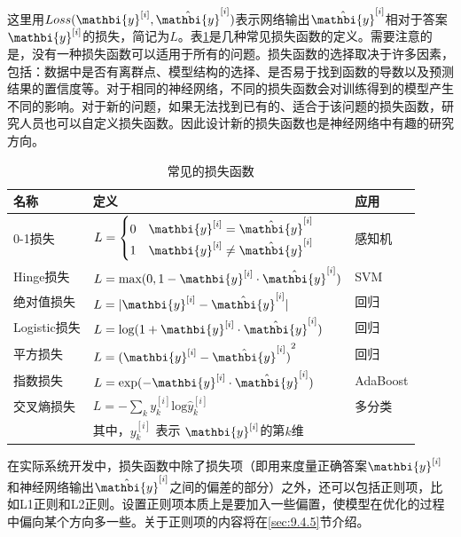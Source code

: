 \parinterval 这里用$ Loss({\mathbi{y}}^{[i]},{\hat{\mathbi{y}}}^{[i]}) $表示网络输出$ {\hat{\mathbi{y}}}^{[i]} $相对于答案$ {\mathbi{y}}^{[i]} $的损失，简记为$ L $。表\ref{tab:9-3}是几种常见损失函数的定义。需要注意的是，没有一种损失函数可以适用于所有的问题。损失函数的选择取决于许多因素，包括：数据中是否有离群点、模型结构的选择、是否易于找到函数的导数以及预测结果的置信度等。对于相同的神经网络，不同的损失函数会对训练得到的模型产生不同的影响。对于新的问题，如果无法找到已有的、适合于该问题的损失函数，研究人员也可以自定义损失函数。因此设计新的损失函数也是神经网络中有趣的研究方向。

\begin{table}[htp]
\centering
\caption{常见的损失函数}
\label{tab:9-3}
\small
\begin{tabular}{l | l l}
\rule{0pt}{15pt}     名称 & 定义 & 应用  \\
\hline
\rule{0pt}{15pt}     0-1损失 & $ L=\begin{cases} 0 & {\mathbi{y}}^{[i]}={\hat{\mathbi{y}}}^{[i]} \\1 & {\mathbi{y}}^{[i]}\not ={\hat{\mathbi{y}}}^{[i]}\end{cases} $ & 感知机  \\
\rule{0pt}{15pt}     Hinge损失 & $ L={\textrm {max}}(0,1-{\mathbi{y}}^{[i]}\cdot {\hat{\mathbi{y}}}^{[i]}) $ & SVM  \\
\rule{0pt}{15pt}     绝对值损失 & $ L=\vert {\mathbi{y}}^{[i]}-{\hat{\mathbi{y}}}^{[i]}\vert $ & 回归  \\
\rule{0pt}{15pt}     Logistic损失 & $ L={\textrm{log}}(1+{\mathbi{y}}^{[i]}\cdot {\hat{\mathbi{y}}}^{[i]}) $ & 回归  \\
\rule{0pt}{15pt}     平方损失 & $ L={({\mathbi{y}}^{[i]}-{\hat{\mathbi{y}}}^{[i]})}^2 $ & 回归  \\
\rule{0pt}{15pt}     指数损失 & $ L={\textrm{exp}}(-{\mathbi{y}}^{[i]}\cdot{\hat{\mathbi{y}}}^{[i]}) $ & AdaBoost  \\
\rule{0pt}{15pt}     交叉熵损失 & $ L=-\sum_{k}{{y}}^{[i]}_{k}{\textrm {log}}{\hat{{y}}}^{[i]}_{k}$ & 多分类  \\
\rule{0pt}{15pt}     & 其中，${{y}}^{[i]}_{k}$ 表示 ${\mathbi{y}}^{[i]}$的第$k$维
\end{tabular}
\end{table}

\parinterval 在实际系统开发中，损失函数中除了损失项（即用来度量正确答案$ {\mathbi{y}}^{[i]} $和神经网络输出$ {\hat{\mathbi{y}}}^{[i]} $之间的偏差的部分）之外，还可以包括正则项，比如L1正则和L2正则。设置正则项本质上是要加入一些偏置，使模型在优化的过程中偏向某个方向多一些。关于正则项的内容将在\ref{sec:9.4.5}节介绍。

